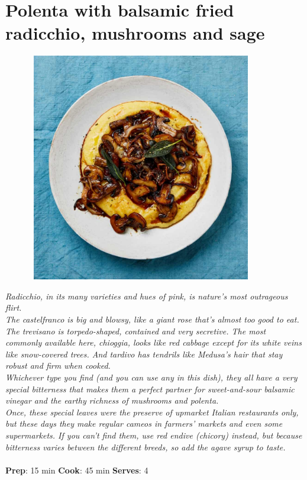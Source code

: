 \documentclass{book}
\begin{document}
\section{Polenta with balsamic fried radicchio, mushrooms and sage}
\begin{figure}
\centering\includegraphics[width=10cm,height=10cm,keepaspectratio]{Recipe_Pictures/Polenta_with_balsamic_fried_radicchio,_mushrooms_and_sage.png}
\end{figure}
\emph{Radicchio, in its many varieties and hues of pink, is nature’s most outrageous flirt. \\ 
The castelfranco is big and blowsy, like a giant rose that’s almost too good to eat. The trevisano is torpedo-shaped, contained and very secretive. The most commonly available here, chioggia, looks like red cabbage except for its white veins like snow-covered trees. And tardivo has tendrils like Medusa’s hair that stay robust and firm when cooked. \\ 
Whichever type you find (and you can use any in this dish), they all have a very special bitterness that makes them a perfect partner for sweet-and-sour balsamic vinegar and the earthy richness of mushrooms and polenta.\\ 
Once, these special leaves were the preserve of upmarket Italian restaurants only, but these days they make regular cameos in farmers’ markets and even some supermarkets. If you can’t find them, use red endive (chicory) instead, but because bitterness varies between the different breeds, so add the agave syrup to taste.}\\\\ 
\textbf{Prep}: 15 min
\textbf{Cook}: 45 min
\textbf{Serves}: 4
\end{document}
